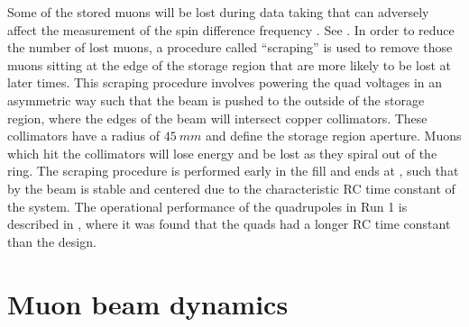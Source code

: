 Some of the stored muons will be lost during data taking that can adversely affect the measurement of the spin difference frequency \wa. See . In order to reduce the number of lost muons, a procedure called ``scraping'' is used to remove those muons sitting at the edge of the storage region that are more likely to be lost at later times. This scraping procedure involves powering the quad voltages in an asymmetric way such that the beam is pushed to the outside of the storage region, where the edges of the beam will intersect copper collimators. These collimators have a radius of $\SI{45}{mm}$ and define the storage region aperture. Muons which hit the collimators will lose energy and be lost as they spiral out of the ring. The scraping procedure is performed early in the fill and ends at , such that by  the beam is stable and centered due to the characteristic RC time constant of the system. The operational performance of the quadrupoles in Run 1 is described in , where it was found that the quads had a longer RC time constant than the design.



\section{Muon beam dynamics}
\label{sec:muonbeamdynamics}

